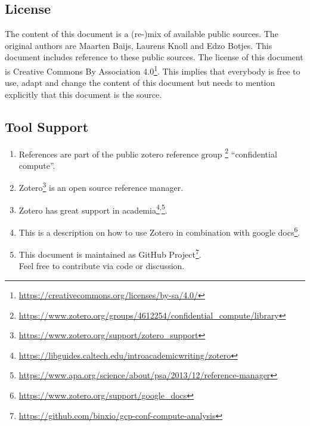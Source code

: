 \subsection{License}

The content of this document is a (re-)mix of available public sources. 
The original authors are Maarten Baijs, Laurens Knoll and Edzo Botjes. 
This document includes reference to these public sources. 
The license of this document is 
Creative Commons By Association 4.0\footnote{\url{https://creativecommons.org/licenses/by-sa/4.0/}}. 
This implies that everybody is free to use, adapt and change the content of this document 
but needs to mention explicitly that this document is the source.

\subsection{Tool Support}

\begin{enumerate}
  \item References are part of the public zotero reference group  
  \footnote{\url{https://www.zotero.org/groups/4612254/confidential_compute/library}}
  “confidential compute”.
  \item Zotero\footnote{\url{https://www.zotero.org/support/zotero_support}} 
  is an open source reference manager.
  \item Zotero has great support in 
  academia\footnote{\url{https://libguides.caltech.edu/introacademicwriting/zotero}}\textsuperscript{,}\footnote{\url{https://www.apa.org/science/about/psa/2013/12/reference-manager}}.
  \item This is a description on how to use Zotero in combination with
  google docs\footnote{\url{https://www.zotero.org/support/google_docs}}.
  \item This document is maintained as 
  GitHub Project\footnote{\url{https://github.com/binxio/gcp-conf-compute-analysis}}.\\ 
  Feel free to contribute via code or discussion.
\end{enumerate}

